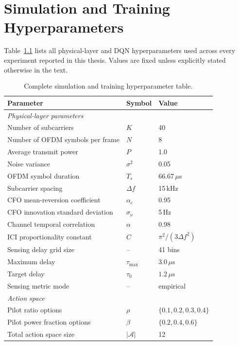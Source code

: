 \chapter{Simulation and Training Hyperparameters}
\label{app:params}

Table~\ref{tab:params} lists all physical-layer and DQN hyperparameters used across every experiment reported in this thesis. Values are fixed unless explicitly stated otherwise in the text.

\begin{table}[!h]
    \centering
    \caption{Complete simulation and training hyperparameter table.}
    \label{tab:params}
    \begin{tabular}{lll}
        \toprule
        Parameter & Symbol & Value \\
        \midrule
        \multicolumn{3}{l}{\textit{Physical-layer parameters}} \\
        Number of subcarriers & $K$ & 40 \\
        Number of OFDM symbols per frame & $N$ & 8 \\
        Average transmit power & $P$ & 1.0 \\
        Noise variance & $\sigma^2$ & 0.05 \\
        OFDM symbol duration & $T_s$ & $66.67\,\mu$s \\
        Subcarrier spacing & $\Delta f$ & 15\,kHz \\
        CFO mean-reversion coefficient & $\alpha_c$ & 0.95 \\
        CFO innovation standard deviation & $\sigma_\nu$ & 5\,Hz \\
        Channel temporal correlation & $\alpha$ & 0.98 \\
        ICI proportionality constant & $C$ & $\pi^2/(3\Delta f^2)$ \\
        Sensing delay grid size & -- & 41 bins \\
        Maximum delay & $\tau_{\max}$ & $3.0\,\mu$s \\
        Target delay & $\tau_0$ & $1.2\,\mu$s \\
        Sensing metric mode & -- & empirical \\[4pt]
        \multicolumn{3}{l}{\textit{Action space}} \\
        Pilot ratio options & $\rho$ & $\{0.1, 0.2, 0.3, 0.4\}$ \\
        Pilot power fraction options & $\beta$ & $\{0.2, 0.4, 0.6\}$ \\
        Total action space size & $|\mathcal{A}|$ & 12 \\

\end{tabular}
\end{table}
